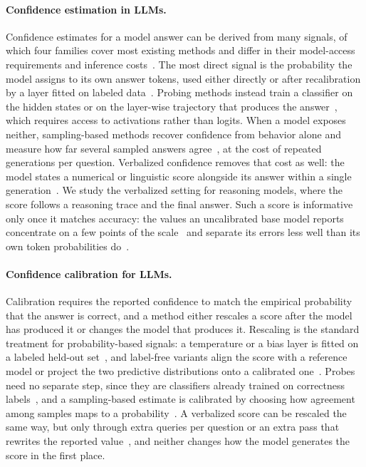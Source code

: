\documentclass{article} %
\begin{document}
\paragraph{Confidence estimation in LLMs.}
Confidence estimates for a model answer can be derived from many signals, of which four
families cover most existing methods and differ in  their model-access requirements
and inference costs~\citep{geng2024survey,liu2025uncertainty}. The most direct signal is the probability
the model assigns to its own answer tokens, used either directly or after recalibration by a layer fitted on labeled
data~\citep{kadavath2022language,liu2024litcab}. Probing methods instead train a classifier
on the hidden states or on the layer-wise trajectory that produces the
answer~\citep{azaria2023internal,eusebi2026reading,srey2026signals}, which requires access
to activations rather than logits. When a model exposes neither, sampling-based methods
recover confidence from behavior alone and measure how far several sampled answers
agree~\citep{kuhn2023semantic,del2026uncertainty,taubenfeld2025confidence}, at the cost of
repeated generations per question. Verbalized confidence removes that cost as well: the
model states a numerical or linguistic score alongside its answer within a single
generation~\citep{lin2022teaching,tian2023just,xiong2024can,yang2024verbalized}. We study
the verbalized setting for reasoning models, where the score follows a reasoning trace and
the final answer. Such a score is informative only once it matches accuracy: the values an
uncalibrated base model reports concentrate on a few points of the
scale~\citep{dai2026rescalingconfidence,cacioli2026saturation} and separate its errors less well
than its own token probabilities do~\citep{ni2024honest,tao2025revisiting}.

\paragraph{Confidence calibration for LLMs.}
Calibration requires the reported confidence to match the empirical probability that the
answer is correct, and a method either rescales a score after the model has produced it or
changes the model that produces it. Rescaling is the standard treatment for
probability-based signals: a temperature or a bias layer is fitted on a labeled held-out
set~\citep{guo2017calibration,liu2024litcab}, and label-free variants align the score with
a reference model or project the two predictive distributions onto a calibrated
one~\citep{luo2025your,kong2026calibration}. Probes need no separate step, since they are
classifiers already trained on correctness
labels~\citep{azaria2023internal,srey2026signals}, and a sampling-based estimate is
calibrated by choosing how agreement among samples maps to a
probability~\citep{kuhn2023semantic,del2026uncertainty}. A verbalized score can be
rescaled the same way, but only through extra queries per question or an extra pass that
rewrites the reported value~\citep{wang2026calibrating,yeh2026retrieval}, and neither
changes how the model generates the score in the first place.
\end{document}
